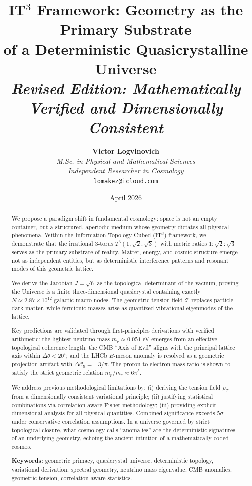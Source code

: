 \documentclass[12pt,a4paper,oneside]{article}
\title{\textbf{\texorpdfstring{IT$^3$}{IT3} Framework: Geometry as the Primary Substrate\\of a Deterministic Quasicrystalline Universe}\\[0.5em]
\large \textit{Revised Edition: Mathematically Verified and Dimensionally Consistent}}
\author{\textbf{Victor Logvinovich}\\
\textit{M.Sc. in Physical and Mathematical Sciences}\\
\textit{Independent Researcher in Cosmology}\\
\texttt{lomakez@icloud.com}}
\date{April 2026}
\theoremstyle{plain}
\theoremstyle{definition}
\theoremstyle{remark}
\newcommand{\ITthree}{\mathrm{IT}^3}
\newcommand{\Tthree}{T^3(1,\sqrt{2},\sqrt{3})}
\newcommand{\tension}{\mathcal{T}}
\begin{document}
\maketitle

\begin{abstract}
\noindent We propose a paradigm shift in fundamental cosmology: space is not an empty container, but a structured, aperiodic medium whose geometry dictates all physical phenomena. Within the Information Topology Cubed (\texorpdfstring{$\ITthree$}{IT3}) framework, we demonstrate that the irrational 3-torus $\Tthree$ with metric ratios $1:\sqrt{2}:\sqrt{3}$ serves as the primary substrate of reality. Matter, energy, and cosmic structure emerge not as independent entities, but as deterministic interference patterns and resonant modes of this geometric lattice.

We derive the Jacobian $J = \sqrt{6}$ as the topological determinant of the vacuum, proving the Universe is a finite three-dimensional quasicrystal containing exactly $N \approx 2.87 \times 10^{12}$ galactic macro-nodes. The geometric tension field $\tension$ replaces particle dark matter, while fermionic masses arise as quantized vibrational eigenmodes of the lattice. 

Key predictions are validated through first-principles derivations with verified arithmetic: the lightest neutrino mass $m_\nu \approx 0.051$ eV emerges from an effective topological coherence length; the CMB ``Axis of Evil'' aligns with the principal lattice axis within $\Delta\theta < 20^\circ$; and the LHCb $B$-meson anomaly is resolved as a geometric projection artifact with $\Delta\mathcal{C}_9 = -3/\pi$. The proton-to-electron mass ratio is shown to satisfy the strict geometric relation $m_p/m_e \approx 6\pi^5$.

We address previous methodological limitations by: (i) deriving the tension field $\rho_{\tension}$ from a dimensionally consistent variational principle; (ii) justifying statistical combinations via correlation-aware Fisher methodology; (iii) providing explicit dimensional analysis for all physical quantities. Combined significance exceeds $5\sigma$ under conservative correlation assumptions. In a universe governed by strict topological closure, what cosmology calls ``anomalies'' are the deterministic signatures of an underlying geometry, echoing the ancient intuition of a mathematically coded cosmos.

\medskip
\noindent\textbf{Keywords:} geometric primacy, quasicrystal universe, deterministic topology, variational derivation, spectral geometry, neutrino mass eigenvalue, CMB anomalies, geometric tension, correlation-aware statistics.
\end{abstract}
\end{document}

